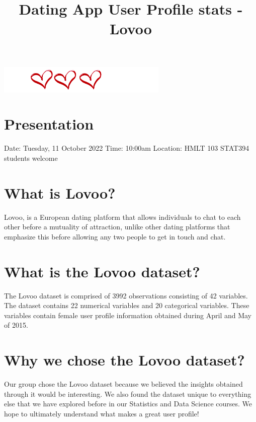 \documentclass[12pt,notumble, nofoldmark]{leaflet}
\begin{document}
{\selectfont
\title{Dating App User Profile \newline stats - Lovoo}
\date{}
\maketitle

\section{}
\begin{center}
  \includegraphics[height=50px]{"../../Images/PNG/Hearts_final.png"}
\end{center}

\section{Presentation}
Date: Tuesday, 11 October 2022 \newline
Time: 10:00am \newline
Location: HMLT 103 \newline
STAT394 students welcome

\clearpage
\section{What is Lovoo?}
Lovoo, is a European dating platform that allows individuals to chat to each other before a mutuality of attraction, unlike other dating platforms that emphasize this before allowing any two people to get in touch and chat. 

\section{What is the Lovoo dataset?}
The Lovoo dataset is comprised of 3992 observations consisting of 42 variables. The dataset contains 22 numerical variables and 20 categorical variables. These variables contain female user profile information obtained during April and May of 2015. \newline

\section{Why we chose the Lovoo dataset?}
Our group chose the Lovoo dataset because we believed the insights obtained through it would be interesting. We also found the dataset unique to everything else that we have explored before in our Statistics and Data Science courses. We hope to ultimately understand what makes a great user profile!

}
\end{document}
